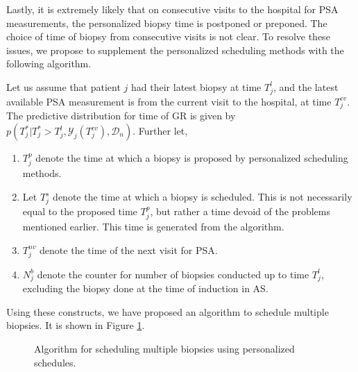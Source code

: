 Lastly, it is extremely likely that on consecutive visits to the hospital for PSA measurements, the personalized biopsy time is postponed or preponed. The choice of time of biopsy from consecutive visits is not clear. To resolve these issues, we propose to supplement the personalized scheduling methods with the following algorithm.

Let us assume that patient $j$ had their latest biopsy at time $T^l_j$, and the latest available PSA measurement is from the current visit to the hospital, at time $T^{cv}_j$. The predictive distribution for time of GR is given by $p(T^*_j|T^*_j > T^l_j, \mathcal{Y}_j(T^{cv}_j), \mathcal{D}_n)$. Further let,

\begin{enumerate}
\item $T^p_j$ denote the time at which a biopsy is proposed by personalized scheduling methods.
\item Let $T^s_j$ denote the time at which a biopsy is scheduled. This is not necessarily equal to the proposed time $T^p_j$, but rather a time devoid of the problems mentioned earlier. This time is generated from the algorithm.
\item $T^{nv}_j$ denote the time of the next visit for PSA.
\item $N^b_j$ denote the counter for number of biopsies conducted up to time $T^l_j$, excluding the biopsy done at the time of induction in AS.
\end{enumerate}
Using these constructs, we have proposed an algorithm to schedule multiple biopsies. It is shown in Figure \ref{fig : sched_algorithm}. 

\begin{figure}
\centering
\captionsetup{justification=centering}

\caption{Algorithm for scheduling multiple biopsies using personalized schedules.} 
\label{fig : sched_algorithm}
\end{figure}